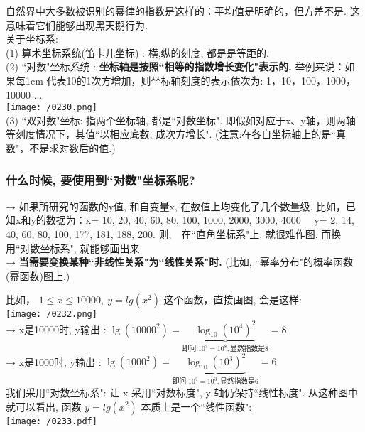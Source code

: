 \documentclass[UTF8]{ctexart}
\begin{document}
	自然界中大多数被识别的幂律的指数是这样的：平均值是明确的，但方差不是. 这意味着它们能够出现黑天鹅行为. \\
	
	关于坐标系: \\
	(1) 算术坐标系统(笛卡儿坐标) : 横,纵的刻度, 都是是等距的. \\
	
	(2) ``对数"坐标系统 : \textbf{坐标轴是按照``相等的指数增长变化"表示的.} 举例来说：如果每1cm 代表10的1次方增加，则坐标轴刻度的表示依次为: 1，10，100，1000，10000 ... \\
	
	\texttt{[image: /0230.png]} \\
	
	
	
	
	
	(3) ``双对数"坐标: 指两个坐标轴, 都是``对数坐标". 即假如对应于x、y轴，则两轴等刻度情况下，其值``以相应底数, 成次方增长". (注意:在各自坐标轴上的是``真数"，不是求对数后的值.) 
	
	
	
	
\subsubsection{什么时候, 要使用到``对数"坐标系呢?}  
	→ 如果所研究的函数的y值, 和自变量x, 在数值上均变化了几个数量级. 比如，已知x和y的数据为：x= 10, 20, 40, 60, 80, 100, 1000, 2000, 3000, 4000 　y= 2, 14, 40, 60, 80, 100, 177, 181, 188, 200. 则,　在``直角坐标系"上, 就很难作图. 而换用``对数坐标系", 就能够画出来. \\
	→ \textbf{当需要变换某种``非线性关系"为``线性关系"时.} (比如, ``幂率分布"的概率函数(幂函数)图上.) \\
	
	
	\begin{myEnvSample}
	比如， $1 \leq x \leq 10000, \ y=lg(x^2)$ 这个函数，直接画图, 会是这样: \\
	\texttt{[image: /0232.png]} \\
	
	→ x是10000时, y输出 : $
	\lg \left( 10000^2 \right) =\underset{\text{即问:}10^?=10^8,\text{显然指数是}8}{\underbrace{\log _{10}\left( 10^4 \right) ^2}}=8
	$ \\
	→ x是1000时, y输出 : $
	\lg \left( 1000^2 \right) =\underset{\text{即问:}10^?=10^3,\text{显然指数是}6}{\underbrace{\log _{10}\left( 10^3 \right) ^2}}=6
	$ \\
	
	我们采用``对数坐标系": 让 x 采用``对数标度", y 轴仍保持``线性标度". 从这种图中就可以看出, 函数 $y=lg(x^2)$ 本质上是一个``线性函数": \\
	\texttt{[image: /0233.pdf]} 
	\end{myEnvSample}
\vspace{1em} 
	
\end{document}
